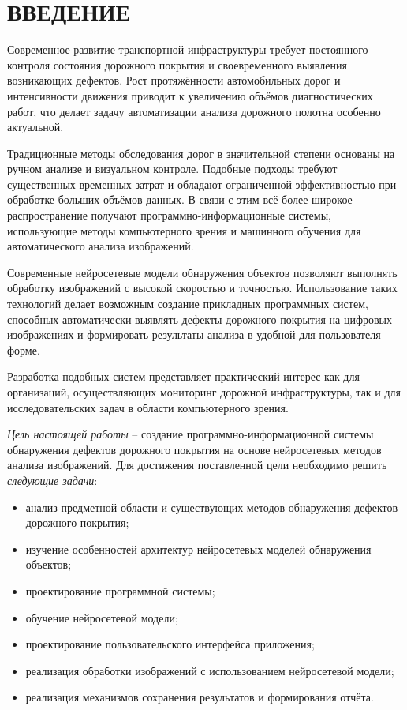 \section*{ВВЕДЕНИЕ}

Современное развитие транспортной инфраструктуры требует постоянного контроля состояния дорожного покрытия и своевременного выявления возникающих дефектов. Рост протяжённости автомобильных дорог и интенсивности движения приводит к увеличению объёмов диагностических работ, что делает задачу автоматизации анализа дорожного полотна особенно актуальной.

Традиционные методы обследования дорог в значительной степени основаны на ручном анализе и визуальном контроле. Подобные подходы требуют существенных временных затрат и обладают ограниченной эффективностью при обработке больших объёмов данных. В связи с этим всё более широкое распространение получают программно-информационные системы, использующие методы компьютерного зрения и машинного обучения для автоматического анализа изображений.

Современные нейросетевые модели обнаружения объектов позволяют выполнять обработку изображений с высокой скоростью и точностью. Использование таких технологий делает возможным создание прикладных программных систем, способных автоматически выявлять дефекты дорожного покрытия на цифровых изображениях и формировать результаты анализа в удобной для пользователя форме.

Разработка подобных систем представляет практический интерес как для организаций, осуществляющих мониторинг дорожной инфраструктуры, так и для исследовательских задач в области компьютерного зрения.

\emph{Цель настоящей работы} -- создание программно-информационной системы обнаружения дефектов дорожного покрытия на основе нейросетевых методов анализа изображений. Для достижения поставленной цели необходимо решить \emph{следующие задачи}:

\begin{itemize}
	\item анализ предметной области и существующих методов обнаружения дефектов дорожного покрытия;
	\item изучение особенностей архитектур нейросетевых моделей обнаружения объектов;
	\item проектирование программной системы;
	\item обучение нейросетевой модели;
	\item проектирование пользовательского интерфейса приложения;
	\item реализация обработки изображений с использованием нейросетевой модели;
	\item реализация механизмов сохранения результатов и формирования отчёта.
\end{itemize}

